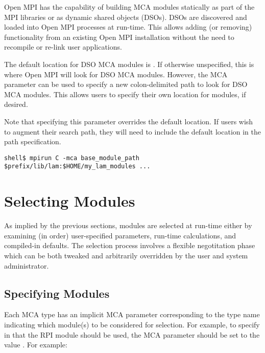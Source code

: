 
Open MPI has the capability of building MCA modules statically as part of
the MPI libraries or as dynamic shared objects (DSOs).  DSOs are
discovered and loaded into Open MPI processes at run-time.  This allows
adding (or removing) functionality from an existing Open MPI installation
without the need to recompile or re-link user applications.

The default location for DSO MCA modules is .
If otherwise unspecified, this is where Open MPI will look for DSO MCA
modules.  However, the MCA parameter
 can be used to specify a new
colon-delimited path to look for DSO MCA modules.  This allows users
to specify their own location for modules, if desired.

Note that specifying this parameter overrides the default location.
If users wish to augment their search path, they will need to include
the default location in the path specification.

\lstset{style=lam-cmdline}
\begin{lstlisting}
shell$ mpirun C -mca base_module_path $prefix/lib/lam:$HOME/my_lam_modules ...
\end{lstlisting}



\section{Selecting Modules}

As implied by the previous sections, modules are selected at run-time
either by examining (in order) user-specified parameters, run-time
calculations, and compiled-in defaults.  The selection process
involves a flexible negotitation phase which can be both tweaked and
arbitrarily overridden by the user and system administrator.


\subsection{Specifying Modules}

Each MCA type has an implicit MCA parameter corresponding to the type
name indicating which module(s) to be considered for selection.  For
example, to specify in that the  RPI module should be used,
the MCA parameter  should be set to the value
.  For example:

